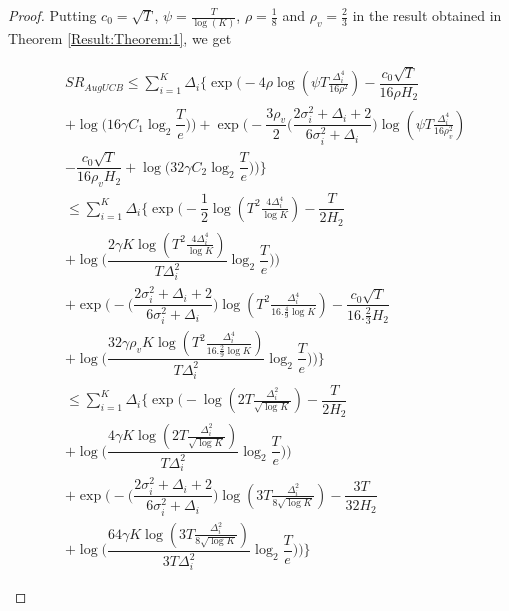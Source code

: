 \begin{proof}
Putting $c_{0}=\sqrt{T}$, $\psi=\frac{T}{\log (K)}$, $\rho=\frac{1}{8}$ and $\rho_v=\frac{2}{3}$ in the result obtained in Theorem \ref{Result:Theorem:1}, we get
\begin{small}
\begin{align*}
& SR_{AugUCB} \leq \sum_{i=1}^{K} \Delta_{i}\bigg\lbrace \exp\bigg(-4\rho\log (\psi T\frac{\Delta_{i}^{4}}{16\rho^{2}})-\dfrac{c_{0}\sqrt{T}}{16\rho H_{2}}\\
& + \log \big( 16\gamma C_1\log_{2}\dfrac{T}{e} \big) \bigg) + \exp\bigg(- \dfrac{3\rho_v}{2} \bigg(\dfrac{2\sigma_{i}^{2}+\Delta_{i}+2}{6\sigma_{i}^{2}+\Delta_{i}}\bigg)\log(\psi T\frac{\Delta_{i}^{4}}{16\rho_{v}^{2}})\\
& -\dfrac{c_{0}\sqrt{T}}{16\rho_v H_{2}} + \log\big ( 32\gamma C_2\log_{2}\dfrac{T}{e} \big)  \bigg)\bigg\rbrace\\
&\leq \sum_{i=1}^{K} \Delta_{i}\bigg\lbrace\exp\bigg(-\dfrac{1}{2}\log ( T^{2}\frac{4\Delta_{i}^{4}}{\log K})-\dfrac{T}{2 H_{2}}\\
& + \log \big( \dfrac{2\gamma K\log ( T^{2} \frac{4\Delta_{i}^{4}}{\log K})}{T\Delta_{i}^{2}}\log_{2}\dfrac{T}{e} \big) \bigg)\\
& + \exp\bigg(-  \bigg(\dfrac{2\sigma_{i}^{2}+\Delta_{i}+2}{6\sigma_{i}^{2}+\Delta_{i}}\bigg)\log( T^{2}\frac{\Delta_{i}^{4}}{16.\frac{4}{9}\log K}) -\dfrac{c_{0}\sqrt{T}}{16.\frac{2}{3} H_{2}}\\
& + \log\big ( \dfrac{32\gamma\rho_v K\log ( T^{2} \frac{\Delta_{i}^{4}}{16.\frac{2}{9}\log K})}{T\Delta_{i}^{2}}\log_{2}\dfrac{T}{e} \big)  \bigg)\bigg\rbrace\\
&\leq \sum_{i=1}^{K} \Delta_{i}\bigg\lbrace\exp\bigg(-\log ( 2T\frac{\Delta_{i}^{2}}{\sqrt{\log K}})-\dfrac{T}{2 H_{2}}\\
& + \log \big( \dfrac{4\gamma K\log ( 2T \frac{\Delta_{i}^{2}}{\sqrt{\log K}})}{T\Delta_{i}^{2}}\log_{2}\dfrac{T}{e} \big) \bigg)\\
& +  \exp\bigg(- \bigg(\dfrac{2\sigma_{i}^{2}+\Delta_{i}+2}{6\sigma_{i}^{2}+\Delta_{i}}\bigg)\log( 3T\frac{\Delta_{i}^{2}}{8\sqrt{\log K}}) -\dfrac{3T}{32 H_{2}}\\
& + \log\big ( \dfrac{64\gamma K\log ( 3T \frac{\Delta_{i}^{2}}{8\sqrt{\log K}})}{3T\Delta_{i}^{2}}\log_{2}\dfrac{T}{e} \big)  \bigg)\bigg\rbrace
\end{align*} 
\end{small}
\end{proof}